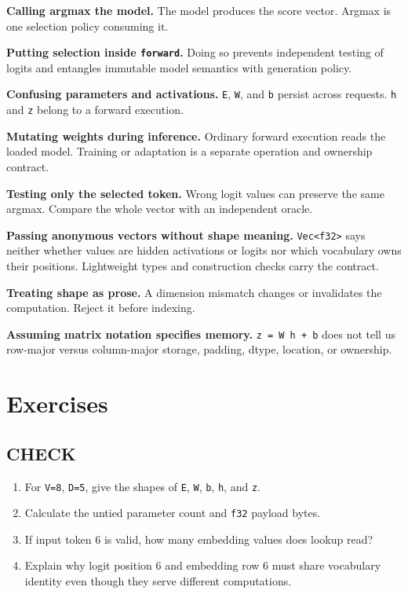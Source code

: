 \textbf{Calling argmax the model.} The model produces the score vector.
Argmax is one selection policy consuming it.

\textbf{Putting selection inside \texttt{forward}.} Doing so prevents
independent testing of logits and entangles immutable model semantics
with generation policy.

\textbf{Confusing parameters and activations.} \texttt{E}, \texttt{W},
and \texttt{b} persist across requests. \texttt{h} and \texttt{z} belong
to a forward execution.

\textbf{Mutating weights during inference.} Ordinary forward execution
reads the loaded model. Training or adaptation is a separate operation
and ownership contract.

\textbf{Testing only the selected token.} Wrong logit values can
preserve the same argmax. Compare the whole vector with an independent
oracle.

\textbf{Passing anonymous vectors without shape meaning.}
\texttt{Vec\textless{}f32\textgreater{}} says neither whether values are
hidden activations or logits nor which vocabulary owns their positions.
Lightweight types and construction checks carry the contract.

\textbf{Treating shape as prose.} A dimension mismatch changes or
invalidates the computation. Reject it before indexing.

\textbf{Assuming matrix notation specifies memory.}
\texttt{z\ =\ W\ h\ +\ b} does not tell us row-major versus column-major
storage, padding, dtype, location, or ownership.

\section{Exercises}\label{exercises-2}

\subsection{CHECK}\label{check-2}

\begin{enumerate}
\def\labelenumi{\arabic{enumi}.}
\tightlist
\item
  For \texttt{V=8}, \texttt{D=5}, give the shapes of \texttt{E},
  \texttt{W}, \texttt{b}, \texttt{h}, and \texttt{z}.
\item
  Calculate the untied parameter count and \texttt{f32} payload bytes.
\item
  If input token 6 is valid, how many embedding values does lookup read?
\item
  Explain why logit position 6 and embedding row 6 must share vocabulary
  identity even though they serve different computations.
\end{enumerate}

